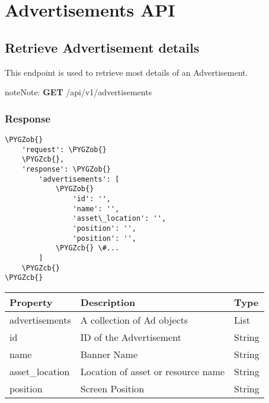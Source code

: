 \documentclass[letterpaper,10pt,english]{sphinxmanual}
\def\PYGZob{\char`\{}
\def\PYGZcb{\char`\}}
\begin{document}
\chapter{Advertisements API}
\label{dev-api-advertisements:advertisements-api}\label{dev-api-advertisements::doc}

\section{Retrieve Advertisement details}
\label{dev-api-advertisements:retrieve-advertisement-details}
This endpoint is used to retrieve most details of an Advertisement.

\begin{notice}{note}{Note:}
\textbf{GET} /api/v1/advertisements
\end{notice}


\subsection{Response}
\label{dev-api-advertisements:response}
\begin{Verbatim}[commandchars=\\\{\}]
\PYGZob{}
    'request': \PYGZob{}
    \PYGZcb{},
    'response': \PYGZob{}
        'advertisements': [
            \PYGZob{}
                'id': '',
                'name': '',
                'asset\_location': '',
                'position': '',
                'position': '',
            \PYGZcb{} \#...
        ]
    \PYGZcb{}
\PYGZcb{}
\end{Verbatim}

\begin{tabulary}{\linewidth}{|L|L|L|}
\hline
\textsf{\relax 
Property
} & \textsf{\relax 
Description
} & \textsf{\relax 
Type
}\\
\hline
advertisements
 & 
A collection of Ad objects
 & 
List
\\

id
 & 
ID of the Advertisement
 & 
String
\\

name
 & 
Banner Name
 & 
String
\\

asset\_location
 & 
Location of asset or resource name
 & 
String
\\

position
 & 
Screen Position
 & 
String
\\
\hline\end{tabulary}
\end{document}
